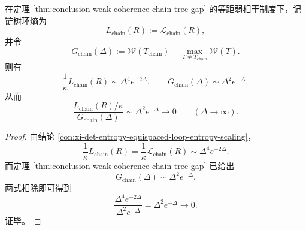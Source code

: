 \begin{theorem}[组合冻结先于环熵显影的两尺度分离]\label{thm:conclusion-combinatorial-freezing-precedes-loop-entropy}
在定理 \ref{thm:conclusion-weak-coherence-chain-tree-gap} 的等距弱相干制度下，记链树环熵为
\[
L_{\mathrm{chain}}(R):=\mathcal L_{\mathrm{chain}}(R),
\]
并令
\[
G_{\mathrm{chain}}(\Delta):=
\mathcal W(T_{\mathrm{chain}})
-\max_{T\neq T_{\mathrm{chain}}}\mathcal W(T).
\]
则有
\[
\frac{1}{\kappa}L_{\mathrm{chain}}(R)\sim \Delta^4e^{-2\Delta},
\qquad
G_{\mathrm{chain}}(\Delta)\sim \Delta^2e^{-\Delta},
\]
从而
\[
\frac{L_{\mathrm{chain}}(R)/\kappa}{G_{\mathrm{chain}}(\Delta)}
\sim
\Delta^2e^{-\Delta}\longrightarrow 0
\qquad (\Delta\to\infty).
\]
\end{theorem}
\begin{proof}
由结论 \ref{con:xi-det-entropy-equispaced-loop-entropy-scaling}，
\[
\frac{1}{\kappa}L_{\mathrm{chain}}(R)
=
\frac{1}{\kappa}\mathcal L_{\mathrm{chain}}(R)
\sim \Delta^4e^{-2\Delta}.
\]
而定理 \ref{thm:conclusion-weak-coherence-chain-tree-gap} 已给出
\[
G_{\mathrm{chain}}(\Delta)\sim \Delta^2e^{-\Delta}.
\]
两式相除即可得到
\[
\frac{\Delta^4e^{-2\Delta}}{\Delta^2e^{-\Delta}}
=
\Delta^2e^{-\Delta}\to 0.
\]
证毕。
\end{proof}

